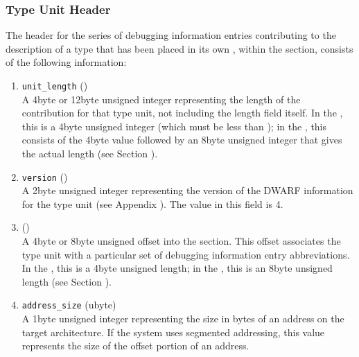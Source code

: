 \subsubsection{Type Unit Header}
\label{datarep:typeunitheader}

The header for the series of debugging information entries
contributing to the description of a type that has been
placed in its own , within the 
\dotdebugtypes{} section,
consists of the following information:
\begin{enumerate}[1. ]

\item \texttt{unit\_length} () \\
A 4\dash byte or 12\dash byte unsigned integer 
representing the length
of the \dotdebugtypes{} contribution for that type unit,
not including the length field itself. In the \thirtytwobitdwarfformat, 
this is a 4\dash byte unsigned integer (which must be
less than \xfffffffzero); in the \sixtyfourbitdwarfformat, this
consists of the 4\dash byte value \wffffffff followed by an 
8\dash byte unsigned integer that gives the actual length
(see Section ).

\item  \texttt{version} () \\
A 2\dash byte unsigned integer representing the version of the
DWARF information for the 
type unit 
(see Appendix ). 
The value in this field is 4.

\item {} () \\
A 
4\dash byte or 8\dash byte unsigned offset into the 
\dotdebugabbrev{}
section. This offset associates the type unit with a
particular set of debugging information entry abbreviations. In
the \thirtytwobitdwarfformat, this is a 4\dash byte unsigned length;
in the \sixtyfourbitdwarfformat, this is an 8\dash byte unsigned length
(see Section ).

\item \texttt{address\_size} (ubyte) \\
A 1\dash byte unsigned integer representing the size 
in bytes of
an address on the target architecture. If the system uses
segmented addressing, this value represents the size of the
offset portion of an address.


\end{enumerate}
